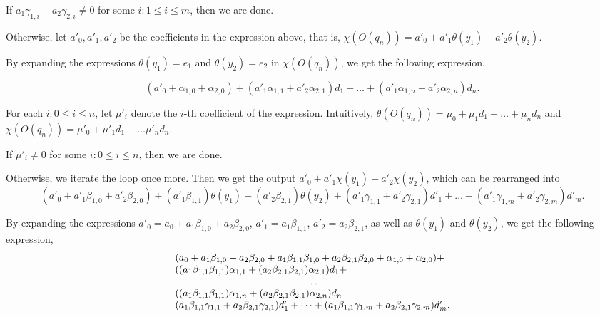 If $a_1 \gamma_{1,i} +a_2 \gamma_{2,i} \neq 0$ for some $i: 1 \le i \le m$, then we are done.


Otherwise, let $a'_0, a'_1,a'_2$ be the coefficients in the expression above, that is, $\chi(O(q_n))=a'_0 + a'_1 \theta(y_1)+ a'_2 \theta(y_2)$.

By expanding the expressions $\theta(y_1)=e_1$ and $\theta(y_2)=e_2$ in $\chi(O(q_n))$, we get the following expression,

\[
(a'_0 + \alpha_{1,0}+\alpha_{2,0}) + (a'_1 \alpha_{1,1}+a'_2 \alpha_{2,1}) d_1 + \dots + (a'_1 \alpha_{1,n}+a'_2 \alpha_{2,n}) d_n.
\]

For each $i: 0 \le i \le n$, let $\mu'_i$ denote the $i$-th coefficient of the expression. 
%
Intuitively, $\theta(O(q_n)) = \mu_0 + \mu_1 d_1 + \dots + \mu_n d_n$ and $\chi(O(q_n)) = \mu'_0 + \mu'_1 d_1 + \dots \mu'_n d_n$.

If $\mu'_i \neq 0$ for some $i: 0 \le i \le n$, then we are done. 

Otherwise, we iterate the loop once more.  Then we get the output $a'_0 + a'_1 \chi(y_1)+ a'_2 \chi(y_2)$, which can be rearranged into
\[
 (a'_0 + a'_1 \beta_{1,0} + a'_2 \beta_{2,0} ) + (a'_1 \beta_{1,1})\theta(y_1)+(a'_2 \beta_{2,1} )\theta(y_2) + 
 (a'_1\gamma_{1,1} + a'_2 \gamma_{2,1}) d'_1 + \dots + (a'_1\gamma_{1,m} + a'_2 \gamma_{2,m}) d'_m.
\]

By expanding the expressions $a'_0 = a_0 + a_1 \beta_{1,0} + a_2 \beta_{2,0}$, $a'_1=a_1 \beta_{1,1}$, $a'_2=a_2 \beta_{2,1}$, as well as $\theta(y_1)$ and $\theta(y_2)$, we get the following expression,
\[
\begin{array}{l}
 (a_0 + a_1 \beta_{1,0} + a_2 \beta_{2,0} + a_1 \beta_{1,1} \beta_{1,0} + a_2 \beta_{2,1} \beta_{2,0} + \alpha_{1,0} + \alpha_{2,0}) + \\
 ((a_1 \beta_{1,1} \beta_{1,1})\alpha_{1,1}+(a_2 \beta_{2,1} \beta_{2,1} ) \alpha_{2,1})d_1 + \\
 \multicolumn{1}{c}{\dots} \\
  ((a_1 \beta_{1,1} \beta_{1,1})\alpha_{1,n}+(a_2 \beta_{2,1} \beta_{2,1} ) \alpha_{2,n})d_n \\
 (a_1 \beta_{1,1}\gamma_{1,1} + a_2 \beta_{2,1} \gamma_{2,1}) d'_1 + 
 \dots + (a_1 \beta_{1,1}\gamma_{1,m} + a_2 \beta_{2,1} \gamma_{2,m}) d'_m.
\end{array}
\]

